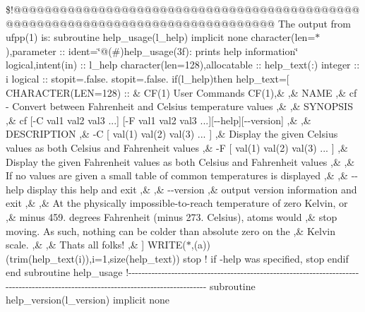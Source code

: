 \$!@@@@@@@@@@@@@@@@@@@@@@@@@@@@@@@@@@@@@@@@@@@@@@@@@@@@@@@@@@@@@@@@@@@@@@@@@@@@@@@@ The output from ufpp(1) is\+: subroutine help\+\_\+usage(l\+\_\+help) implicit none character(len=$\ast$),parameter \+:: ident=\char`\"{}@(\#)help\+\_\+usage(3f)\+: prints help information\char`\"{} logical,intent(in) \+:: l\+\_\+help character(len=128),allocatable \+:: help\+\_\+text(\+:) integer \+:: i logical \+:: stopit=.\+false. stopit=.\+false. if(l\+\_\+help)then help\+\_\+text=\mbox{[} C\+H\+A\+R\+A\+C\+T\+E\+R(\+L\+E\+N=128) \+:: \& \textquotesingle{}\+C\+F(1) User Commands C\+F(1)\textquotesingle{},\& \textquotesingle{} \textquotesingle{},\& \textquotesingle{}\+N\+A\+M\+E \textquotesingle{},\& \textquotesingle{} cf -\/ Convert between Fahrenheit and Celsius temperature values \textquotesingle{},\& \textquotesingle{} \textquotesingle{},\& \textquotesingle{}\+S\+Y\+N\+O\+P\+S\+I\+S \textquotesingle{},\& \textquotesingle{} cf \mbox{[}-\/\+C val1 val2 val3 ...\mbox{]} \mbox{[}-\/\+F val1 val2 val3 ...\mbox{]}\mbox{[}-\/-\/help\mbox{]}\mbox{[}-\/-\/version\mbox{]} \textquotesingle{},\& \textquotesingle{} \textquotesingle{},\& \textquotesingle{}\+D\+E\+S\+C\+R\+I\+P\+T\+I\+O\+N \textquotesingle{},\& \textquotesingle{} -\/\+C \mbox{[} val(1) val(2) val(3) ... \mbox{]} \textquotesingle{},\& \textquotesingle{} Display the given Celsius values as both Celsius and Fahrenheit values \textquotesingle{},\& \textquotesingle{} -\/\+F \mbox{[} val(1) val(2) val(3) ... \mbox{]} \textquotesingle{},\& \textquotesingle{} Display the given Fahrenheit values as both Celsius and Fahrenheit values \textquotesingle{},\& \textquotesingle{} \textquotesingle{},\& \textquotesingle{} If no values are given a small table of common temperatures is displayed \textquotesingle{},\& \textquotesingle{} \textquotesingle{},\& \textquotesingle{} -\/-\/help display this help and exit \textquotesingle{},\& \textquotesingle{} \textquotesingle{},\& \textquotesingle{} -\/-\/version \textquotesingle{},\& \textquotesingle{} output version information and exit \textquotesingle{},\& \textquotesingle{} \textquotesingle{},\& \textquotesingle{} At the physically impossible-\/to-\/reach temperature of zero Kelvin, or \textquotesingle{},\& \textquotesingle{} minus 459. degrees Fahrenheit (minus 273. Celsius), atoms would \textquotesingle{},\& \textquotesingle{} stop moving. As such, nothing can be colder than absolute zero on the \textquotesingle{},\& \textquotesingle{} Kelvin scale. \textquotesingle{},\& \textquotesingle{} \textquotesingle{},\& \textquotesingle{} That\textquotesingle{}\textquotesingle{}s all folks! \textquotesingle{},\& \textquotesingle{}\textquotesingle{}\mbox{]} W\+R\+I\+T\+E($\ast$,\textquotesingle{}(a)\textquotesingle{})(trim(help\+\_\+text(i)),i=1,size(help\+\_\+text)) stop ! if -\/help was specified, stop endif end subroutine help\+\_\+usage !-\/-\/-\/-\/-\/-\/-\/-\/-\/-\/-\/-\/-\/-\/-\/-\/-\/-\/-\/-\/-\/-\/-\/-\/-\/-\/-\/-\/-\/-\/-\/-\/-\/-\/-\/-\/-\/-\/-\/-\/-\/-\/-\/-\/-\/-\/-\/-\/-\/-\/-\/-\/-\/-\/-\/-\/-\/-\/-\/-\/-\/-\/-\/-\/-\/-\/-\/-\/-\/-\/-\/-\/-\/-\/-\/-\/-\/-\/-\/-\/-\/-\/-\/-\/-\/-\/-\/-\/-\/-\/-\/-\/-\/-\/-\/-\/-\/-\/-\/-\/-\/-\/-\/-\/-\/-\/-\/-\/-\/-\/-\/-\/-\/-\/-\/-\/-\/-\/-\/-\/-\/-\/-\/-\/-\/-\/-\/-\/-\/-\/-\/ subroutine help\+\_\+version(l\+\_\+version) implicit none 